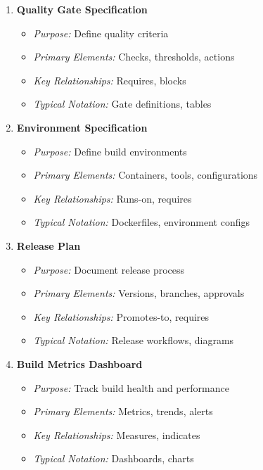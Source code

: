 \documentclass[11pt,letterpaper]{article}
\begin{document}
\begin{enumerate}[label=\textbf{MT\arabic*:}, leftmargin=2.5em]
    \item \textbf{Quality Gate Specification}
    \begin{itemize}[nosep]
        \item \textit{Purpose:} Define quality criteria
        \item \textit{Primary Elements:} Checks, thresholds, actions
        \item \textit{Key Relationships:} Requires, blocks
        \item \textit{Typical Notation:} Gate definitions, tables
    \end{itemize}
    
    \item \textbf{Environment Specification}
    \begin{itemize}[nosep]
        \item \textit{Purpose:} Define build environments
        \item \textit{Primary Elements:} Containers, tools, configurations
        \item \textit{Key Relationships:} Runs-on, requires
        \item \textit{Typical Notation:} Dockerfiles, environment configs
    \end{itemize}
    
    \item \textbf{Release Plan}
    \begin{itemize}[nosep]
        \item \textit{Purpose:} Document release process
        \item \textit{Primary Elements:} Versions, branches, approvals
        \item \textit{Key Relationships:} Promotes-to, requires
        \item \textit{Typical Notation:} Release workflows, diagrams
    \end{itemize}
    
    \item \textbf{Build Metrics Dashboard}
    \begin{itemize}[nosep]
        \item \textit{Purpose:} Track build health and performance
        \item \textit{Primary Elements:} Metrics, trends, alerts
        \item \textit{Key Relationships:} Measures, indicates
        \item \textit{Typical Notation:} Dashboards, charts
    \end{itemize}
    

\end{enumerate}
\end{document}
